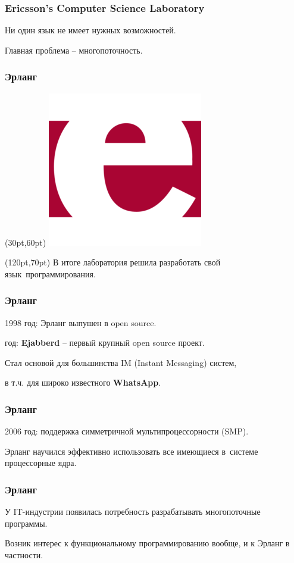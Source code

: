\documentclass[10pt]{beamer}
\begin{document}
\begin{frame}
  \frametitle{Ericsson’s Computer Science Laboratory}
  Ни один язык не имеет нужных возможностей.
  \par \bigskip
  Главная проблема -- многопоточность.
\end{frame}

\begin{frame}
  \frametitle{Эрланг}
  \begin{textblock*}{75pt}(30pt,60pt)
    \includegraphics[scale=2.8]{erlang_logo}
  \end{textblock*}
  \begin{textblock*}{220pt}(120pt,70pt)
    В итоге лаборатория решила разработать свой язык~программирования.
  \end{textblock*}
\end{frame}

\begin{frame}
  \frametitle{Эрланг}
  1998 год: Эрланг выпушен в open source.
  \par {} год: \textbf{Ejabberd} -- первый крупный open source проект.
  \par \bigskip
  Стал основой для большинства IM (Instant Messaging) систем,
  \par \bigskip
  в т.ч. для широко известного \textbf{WhatsApp}.
\end{frame}

\begin{frame}
  \frametitle{Эрланг}
  2006 год: поддержка симметричной мультипроцессорности (SMP).
  \par \bigskip
  Эрланг научился эффективно использовать все имеющиеся в~системе процессорные ядра.
\end{frame}

\begin{frame}
  \frametitle{Эрланг}
  У IT-индустрии появилась потребность
  разрабатывать многопоточные программы.
  \par \bigskip
  Возник интерес к функциональному программированию вообще,
  и к Эрланг в частности.
\end{frame}
\end{document}

